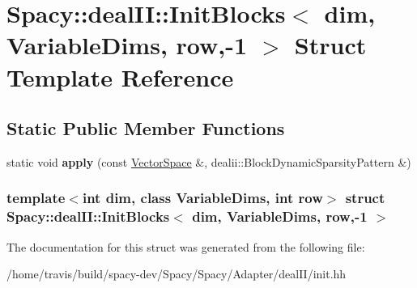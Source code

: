 \hypertarget{structSpacy_1_1dealII_1_1InitBlocks_3_01dim_00_01VariableDims_00_01row_00-1_01_4}{\section{\-Spacy\-:\-:deal\-I\-I\-:\-:\-Init\-Blocks$<$ dim, \-Variable\-Dims, row,-\/1 $>$ \-Struct \-Template \-Reference}
\label{structSpacy_1_1dealII_1_1InitBlocks_3_01dim_00_01VariableDims_00_01row_00-1_01_4}
}
\subsection*{\-Static \-Public \-Member \-Functions}
\begin{DoxyCompactItemize}
\item 
\hypertarget{structSpacy_1_1dealII_1_1InitBlocks_3_01dim_00_01VariableDims_00_01row_00-1_01_4_af03542874eb72a5a0415dbeff9486e10}{static void {\bfseries apply} (const \hyperlink{classSpacy_1_1VectorSpace}{\-Vector\-Space} \&, dealii\-::\-Block\-Dynamic\-Sparsity\-Pattern \&)}\label{structSpacy_1_1dealII_1_1InitBlocks_3_01dim_00_01VariableDims_00_01row_00-1_01_4_af03542874eb72a5a0415dbeff9486e10}

\end{DoxyCompactItemize}
\subsubsection*{template$<$int dim, class Variable\-Dims, int row$>$ struct Spacy\-::deal\-I\-I\-::\-Init\-Blocks$<$ dim, Variable\-Dims, row,-\/1 $>$}



\-The documentation for this struct was generated from the following file\-:\begin{DoxyCompactItemize}
\item 
/home/travis/build/spacy-\/dev/\-Spacy/\-Spacy/\-Adapter/deal\-I\-I/init.\-hh\end{DoxyCompactItemize}

